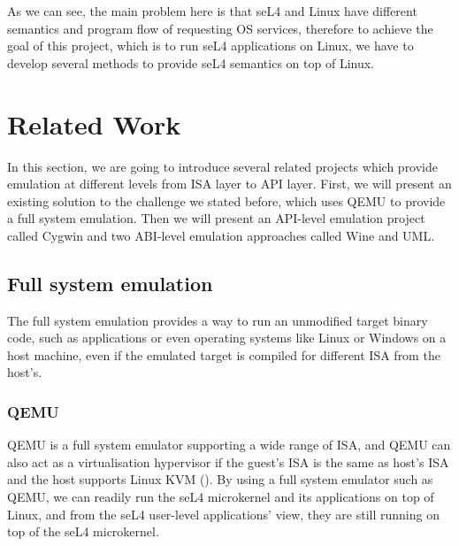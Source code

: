 As we can see, the main problem here is that seL4 and Linux have different semantics and program flow of requesting OS services, therefore to achieve the goal of this project, which is to run seL4 applications on Linux, we have to develop several methods to provide seL4 semantics on top of Linux.

\section{Related Work}


In this section, we are going to introduce several related projects which provide emulation at different levels from ISA layer to API layer. First, we will present an existing solution to the challenge we stated before, which uses QEMU to provide a full system emulation. Then we will present an API-level emulation project called Cygwin and two ABI-level emulation approaches called Wine and UML. 

\subsection{Full system emulation}

The full system emulation provides a way to run an unmodified target binary code, such as applications or even operating systems like Linux or Windows on a host machine, even if the emulated target is compiled for different ISA from the host's.

\subsubsection{QEMU}


QEMU is a full system emulator supporting a wide range of ISA, and QEMU can also act as a virtualisation hypervisor if the guest's ISA is the same as host's ISA and the host supports Linux KVM (\cite{enwikiqemu}). By using a full system emulator such as QEMU, we can readily run the seL4 microkernel and its applications on top of Linux, and from the seL4 user-level applications' view, they are still running on top of the seL4 microkernel. 

